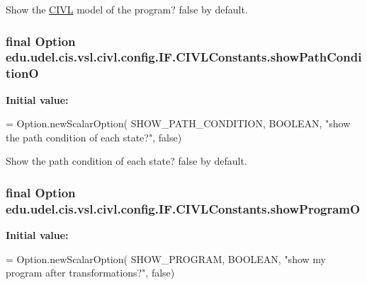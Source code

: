 Show the \hyperlink{classedu_1_1udel_1_1cis_1_1vsl_1_1civl_1_1CIVL}{C\+I\+V\+L} model of the program? false by default. 

\hypertarget{classedu_1_1udel_1_1cis_1_1vsl_1_1civl_1_1config_1_1IF_1_1CIVLConstants_a5a793aeb5f88161ab59225972f6727c7}{}
\subsubsection[{show\+Path\+Condition\+O}]{\setlength{\rightskip}{0pt plus 5cm}final Option edu.\+udel.\+cis.\+vsl.\+civl.\+config.\+I\+F.\+C\+I\+V\+L\+Constants.\+show\+Path\+Condition\+O\hspace{0.3cm}{\ttfamily [static]}}\label{classedu_1_1udel_1_1cis_1_1vsl_1_1civl_1_1config_1_1IF_1_1CIVLConstants_a5a793aeb5f88161ab59225972f6727c7}
{\bfseries Initial value\+:}
\begin{DoxyCode}
= Option.newScalarOption(
            SHOW\_PATH\_CONDITION, BOOLEAN,
            \textcolor{stringliteral}{"show the path condition of each state?"}, \textcolor{keyword}{false})
\end{DoxyCode}


Show the path condition of each state? false by default. 

\hypertarget{classedu_1_1udel_1_1cis_1_1vsl_1_1civl_1_1config_1_1IF_1_1CIVLConstants_a8a10df909dd4d4228765dd0e66036dcd}{}
\subsubsection[{show\+Program\+O}]{\setlength{\rightskip}{0pt plus 5cm}final Option edu.\+udel.\+cis.\+vsl.\+civl.\+config.\+I\+F.\+C\+I\+V\+L\+Constants.\+show\+Program\+O\hspace{0.3cm}{\ttfamily [static]}}\label{classedu_1_1udel_1_1cis_1_1vsl_1_1civl_1_1config_1_1IF_1_1CIVLConstants_a8a10df909dd4d4228765dd0e66036dcd}
{\bfseries Initial value\+:}
\begin{DoxyCode}
= Option.newScalarOption(
            SHOW\_PROGRAM, BOOLEAN, \textcolor{stringliteral}{"show my program after transformations?"},
            \textcolor{keyword}{false})
\end{DoxyCode}


